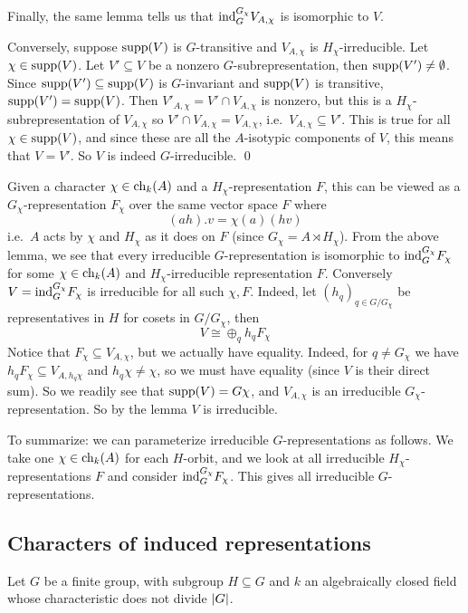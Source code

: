     Finally, the same lemma tells us that ${\rm ind}^{G_\chi}_GV_{A,\chi}$ is isomorphic to $V$.

    Conversely, suppose ${\rm supp}(V)$ is $G$-transitive and $V_{A,\chi}$ is $H_\chi$-irreducible.
    Let $\chi\in{\rm supp}(V)$.
    Let $V'\subseteq V$ be a nonzero $G$-subrepresentation, then ${\rm supp}(V')\neq\emptyset$.
    Since ${\rm supp}(V')\subseteq{\rm supp}(V)$ is $G$-invariant and ${\rm supp}(V)$ is transitive, ${\rm supp}(V')={\rm supp}(V)$.
    Then $V'_{A,\chi}=V'\cap V_{A,\chi}$ is nonzero, but this is a $H_\chi$-subrepresentation of $V_{A,\chi}$ so $V'\cap V_{A,\chi}=V_{A,\chi}$, i.e.\ $V_{A,\chi}\subseteq V'$.
    This is true for all $\chi\in{\rm supp}(V)$, and since these are all the $A$-isotypic components of $V$, this means that $V=V'$.
    So $V$ is indeed $G$-irreducible.
    \qed

\eproof

Given a character $\chi\in{\rm ch}_k(A)$ and a $H_\chi$-representation $F$, this can be viewed as a $G_\chi$-representation $F_\chi$ over the same vector space $F$ where
$$ (ah).v = \chi(a)(hv) $$
i.e.\ $A$ acts by $\chi$ and $H_\chi$ as it does on $F$ (since $G_\chi=A\rtimes H_\chi$).
From the above lemma, we see that every irreducible $G$-representation is isomorphic to ${\rm ind}^{G_\chi}_GF_\chi$ for some $\chi\in{\rm ch}_k(A)$ and $H_\chi$-irreducible representation $F$.
Conversely $V={\rm ind}^{G_\chi}_GF_\chi$ is irreducible for all such $\chi,F$.
Indeed, let $(h_q)_{q\in G/G_\chi}$ be representatives in $H$ for cosets in $G/G_\chi$, then
$$ V \cong \oplus_qh_qF_\chi $$
Notice that $F_\chi\subseteq V_{A,\chi}$, but we actually have equality.
Indeed, for $q\neq G_\chi$ we have $h_qF_\chi\subseteq V_{A,h_q\chi}$ and $h_q\chi\neq\chi$, so we must have equality (since $V$ is their direct sum).
So we readily see that ${\rm supp}(V)=G\chi$, and $V_{A,\chi}$ is an irreducible $G_\chi$-representation.
So by the lemma $V$ is irreducible.

To summarize: we can parameterize irreducible $G$-representations as follows.
We take one $\chi\in{\rm ch}_k(A)$ for each $H$-orbit, and we look at all irreducible $H_\chi$-representations $F$ and consider ${\rm ind}^{G_\chi}_GF_\chi$.
This gives all irreducible $G$-representations.

\subsection{Characters of induced representations}

Let $G$ be a finite group, with subgroup $H\subseteq G$ and $k$ an algebraically closed field whose characteristic does not divide $\mathopen{}\mathclose{\left|G\right|}$.

